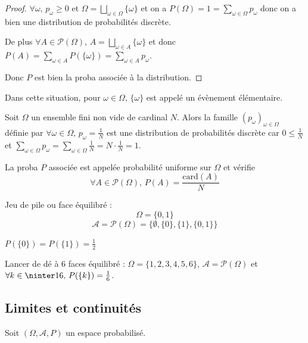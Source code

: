 \begin{proof}
    $\forall \omega, \, p_\omega \geqslant 0$ et $\displaystyle \Omega = \bigsqcup_{\omega \in \Omega} \{\omega\}$
    et on a $\displaystyle P(\Omega) = 1 = \sum_{\omega \in \Omega}  p_\omega$ donc 
    on a bien une distribution de probabilités discrète.

    De plus $\forall A \in \mathscr P(\Omega)$, 
    $\displaystyle A = \bigsqcup_{\omega \in A} \{\omega\}$ et donc $\displaystyle P(A) = \sum_{\omega \in A} P(\{\omega\}) = \sum_{\omega \in A} p_\omega$.

    Donc $P$ est bien la proba associée à la distribution. 
\end{proof}

\begin{remarque}
    Dans cette situation, pour $\omega \in \Omega, \, \{\omega\}$ est appelé un évènement élémentaire.
\end{remarque}

\begin{exemple}
    Soit $\Omega$ un ensemble fini non vide de cardinal $N$. Alors la famille 
    $(p_\omega)_{\omega \in \Omega}$ définie par
    $\forall \omega \in \Omega, \, p_\omega = \frac 1 N$
    est une distribution de probabilités discrète car 
    $0 \leqslant \frac 1 N $ et $\displaystyle \sum_{\omega \in \Omega} p_\omega = \sum_{\omega \in \Omega} \frac 1 N = N \cdot \frac 1 N = 1$.

    La proba $P$ associée est appelée probabilité uniforme sur $\Omega$ et vérifie 
    $$\forall A \in \mathscr P(\Omega), \, P(A) = \frac{\text{card}(A)}{N}$$
\end{exemple}

\begin{exemple}
    Jeu de pile ou face équilibré :
    $$ \Omega = \{0, 1\}$$
    $$ \mathcal A = \mathscr P(\Omega) = \{\emptyset, \{0\}, \{1\}, \{0, 1\}\}$$

    $P(\{0\}) = P(\{1\}) = \frac 1 2$

    Lancer de dé à 6 faces équilibré : 
    $ \Omega = \{1, 2, 3, 4, 5, 6\}$, $\mathcal A = \mathscr P(\Omega)$ et
    $\forall k \in \ninter 1 6, \, P(\{k\}) = \frac 1 6$. 
\end{exemple}

\subsection{Limites et continuités}

Soit $(\Omega, \mathcal A, P)$ un espace probabilisé.

